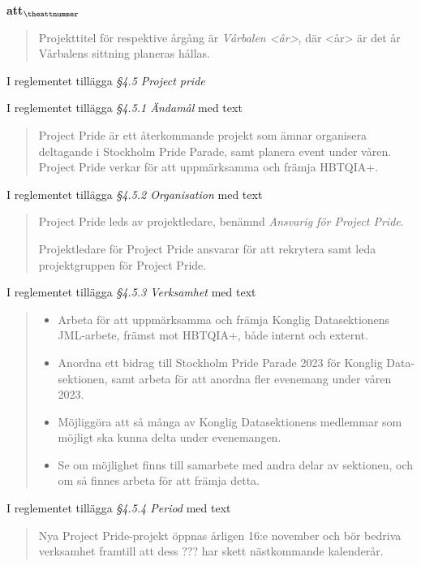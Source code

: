\documentclass[a4paper]{article}
\begin{document}
\begin{list}{\bf att$_{\theattnummer}$}{}
\begin{quote}
        Projekttitel för respektive årgång är \textit{Vårbalen <år>}, där <år> är det år Vårbalens sittning planeras hållas.
    \end{quote}


\item I reglementet tillägga \textit{\S4.5 Project pride}
\item I reglementet tillägga \textit{\S4.5.1 Ändamål} med text
    \begin{quote}
        Project Pride är ett återkommande projekt som ämnar organisera
        deltagande i Stockholm Pride Parade, samt planera event under våren.
        Project Pride verkar för att uppmärksamma och främja HBTQIA+.
    \end{quote}
\item I reglementet tillägga \textit{\S4.5.2 Organisation} med text
    \begin{quote}
        Project Pride leds av projektledare, benämnd \textit{Ansvarig för Project Pride}.

        Projektledare för Project Pride ansvarar för att rekrytera samt leda projektgruppen
        för Project Pride.
    \end{quote}
\item I reglementet tillägga \textit{\S4.5.3 Verksamhet} med text
    \begin{quote}
        \begin{itemize}
            \item Arbeta för att uppmärksamma och främja Konglig Datasektionens JML-arbete, främst mot HBTQIA+, både internt och externt.
            \item Anordna ett bidrag till Stockholm Pride Parade 2023 för Konglig Data-sektionen, samt arbeta för att anordna fler evenemang under våren 2023.
            \item Möjliggöra att så många av Konglig Datasektionens medlemmar som möjligt ska kunna delta under evenemangen.
            \item Se om möjlighet finns till samarbete med andra delar av sektionen, och om så finnes arbeta för att främja detta.
        \end{itemize}
    \end{quote}
\item I reglementet tillägga \textit{\S4.5.4 Period} med text
    \begin{quote}
        Nya Project Pride-projekt öppnas årligen 16:e november och bör bedriva verksamhet framtill att dess ??? har skett nästkommande kalenderår.


\end{quote}
\end{list}
\end{document}
